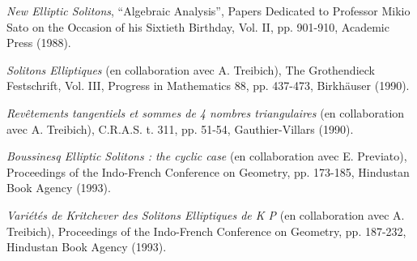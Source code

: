 \begin{description}
\item[{[50]}] \emph{New Elliptic Solitons}, ``Algebraic Analysis'', Papers
Dedicated to Professor Mikio Sato on the Occasion of his Sixtieth Birthday,
Vol. II, pp. 901-910, Academic Press (1988).

\item[{[51]}] \emph{Solitons Elliptiques} (en collaboration avec A. Treibich),
The Grothendieck Festschrift, Vol. III, Progress in Mathematics 88,
pp. 437-473, Birkhäuser (1990).

\item[{[52]}] \emph{Revêtements tangentiels et sommes de 4 nombres
triangulaires} (en collaboration avec A. Treibich), C.R.A.S. t. 311,
pp. 51-54, Gauthier-Villars (1990).

\item[{[53]}] \emph{Boussinesq Elliptic Solitons : the cyclic case}
(en collaboration avec E. Previato), Proceedings of the Indo-French
Conference on Geometry, pp. 173-185, Hindustan Book Agency (1993).

\item[{[54]}] \emph{Variétés de Kritchever des Solitons Elliptiques de K P}
(en collaboration avec A. Treibich), Proceedings of the Indo-French
Conference on Geometry, pp. 187-232, Hindustan Book Agency (1993).
\end{description}

